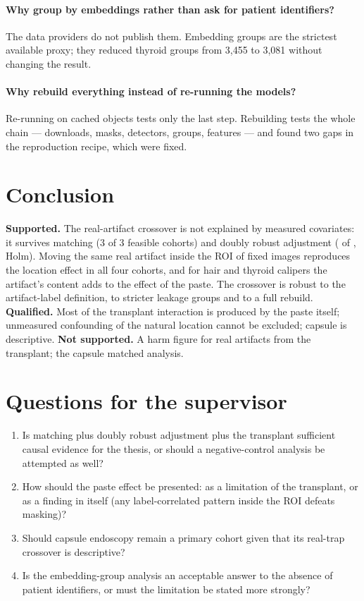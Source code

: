 \paragraph{Why group by embeddings rather than ask for patient identifiers?} The data providers do not publish them.
Embedding groups are the strictest available proxy; they reduced thyroid groups from 3,455 to 3,081 without changing the
result.
\paragraph{Why rebuild everything instead of re-running the models?} Re-running on cached objects tests only the last
step. Rebuilding tests the whole chain --- downloads, masks, detectors, groups, features --- and found two gaps in the
reproduction recipe, which were fixed.

\section{Conclusion}
\textbf{Supported.} The real-artifact crossover is not explained by measured covariates: it survives matching (3 of 3
feasible cohorts) and doubly robust adjustment (\sFourNATwoOK{} of \sFourNATwo, Holm). Moving the same real artifact inside
the ROI of fixed images reproduces the location effect in all four cohorts, and for hair and thyroid calipers the
artifact's content adds to the effect of the paste. The crossover is robust to the artifact-label definition, to stricter
leakage groups and to a full rebuild. \textbf{Qualified.} Most of the transplant interaction is produced by the paste
itself; unmeasured confounding of the natural location cannot be excluded; capsule is descriptive.
\textbf{Not supported.} A harm figure for real artifacts from the transplant; the capsule matched analysis.

\section{Questions for the supervisor}
\begin{enumerate}\itemsep1pt
\item Is matching plus doubly robust adjustment plus the transplant sufficient causal evidence for the thesis, or should a
negative-control analysis be attempted as well?
\item How should the paste effect be presented: as a limitation of the transplant, or as a finding in itself (any
label-correlated pattern inside the ROI defeats masking)?
\item Should capsule endoscopy remain a primary cohort given that its real-trap crossover is descriptive?
\item Is the embedding-group analysis an acceptable answer to the absence of patient identifiers, or must the
limitation be stated more strongly?
\end{enumerate}




